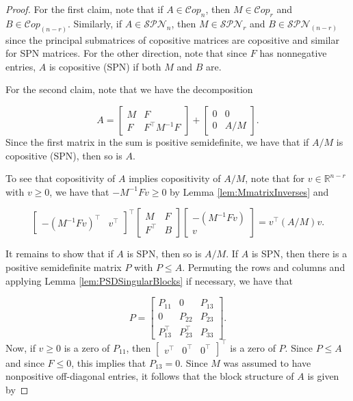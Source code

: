 \documentclass{amsart}
\newcommand{\bbR}{\mathbb{R}}
\newcommand{\Cop}{\mathcal{C}op}
\newcommand{\SPN}{\mathcal{SPN}}
\theoremstyle{definition}
\begin{document}
\begin{proof}
For the first claim, note that if $A \in \Cop_n$, then $M \in \Cop_r$ and $B \in \Cop_{(n-r)}$. Similarly, if $A \in \SPN_n$, then $M \in \SPN_r$ and $B \in \SPN_{(n-r)}$ since the principal submatrices of copositive matrices are copositive and similar for SPN matrices. For the other direction, note that since $F$ has nonnegative entries, $A$ is copositive (SPN) if both $M$ and $B$ are. 

For the second claim, note that we have the decomposition

\[A = \begin{bmatrix} M & F\\ F & F^\top M^{-1} F \end{bmatrix} + \begin{bmatrix}0 & 0\\ 0 & A/M \end{bmatrix}.\]
%
Since the first matrix in the sum is positive semidefinite, we have that if $A/M$ is copositive (SPN), then so is $A$. 

To see that copositivity of $A$ implies copositivity of $A/M$, note that for $v \in \bbR^{n-r}$ with $v \geq 0$, we have that $-M^{-1}Fv \geq 0$ by Lemma \ref{lem:MmatrixInverses} and 

\[\begin{bmatrix} -(M^{-1}Fv)^\top & v^\top \end{bmatrix}^\top \begin{bmatrix} M & F\\ F^\top &B\end{bmatrix}\begin{bmatrix} -(M^{-1}Fv) \\ v \end{bmatrix} = v^\top (A/M) v.\]

It remains to show that if $A$ is SPN, then so is $A/M$. If $A$ is SPN, then there is a positive semidefinite matrix $P$ with $P \leq A$. Permuting the rows and columns and applying Lemma \ref{lem:PSDSingularBlocks} if necessary, we have that 

\[P = \begin{bmatrix} P_{11} & 0 & P_{13}\\ 0 & P_{22} & P_{23}\\ P_{13}^\top & P_{23}^\top & P_{33} \end{bmatrix}.\]
%
Now, if $v\geq 0$ is a zero of $P_{11}$, then $\begin{bmatrix}v^\top & 0^\top&0^\top \end{bmatrix}^\top$ is a zero of $P$. Since $P\leq A$ and since $F \leq 0$, this implies that $P_{13} = 0$. Since $M$ was assumed to have nonpositive off-diagonal entries, it follows that the block structure of $A$ is given by 


\end{proof}
\end{document}
